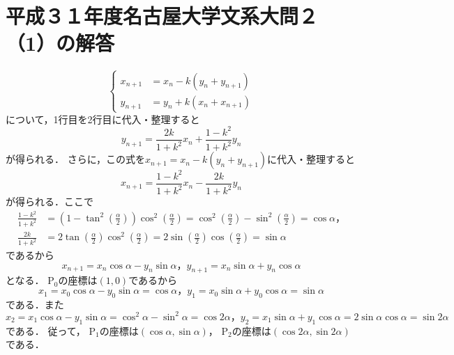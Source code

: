 \documentclass{jsarticle}
\begin{document}
\section{平成３１年度名古屋大学文系大問２（1）の解答}
\[
\begin{cases}
x_{n+1}&=x_n-k(y_n+y_{n+1}) \\
y_{n+1}&=y_n+k(x_n+x_{n+1})
\end{cases}
\]
について，1行目を2行目に代入・整理すると
\[
y_{n+1}=\frac{2k}{1+k^2}x_n+\frac{1-k^2}{1+k^2}y_n
\]
が得られる．
さらに，この式を$x_{n+1}=x_n-k(y_n+y_{n+1})$に代入・整理すると
\[
x_{n+1}=\frac{1-k^2}{1+k^2}x_n-\frac{2k}{1+k^2}y_n
\]
が得られる．ここで
\begin{align*}
\frac{1-k^2}{1+k^2}
&=(1-\tan^2(\frac{\alpha}{2}))\cos^2(\frac{\alpha}{2})
=\cos^2(\frac{\alpha}{2})-\sin^2(\frac{\alpha}{2})
=\cos\alpha，\\
\frac{2k}{1+k^2}
&=2\tan(\frac{\alpha}{2})\cos^2(\frac{\alpha}{2})
=2\sin(\frac{\alpha}{2})\cos(\frac{\alpha}{2})
=\sin\alpha
\end{align*}
であるから
\[
x_{n+1}=x_n\cos\alpha-y_n\sin\alpha，
y_{n+1}=x_n\sin\alpha+y_n\cos\alpha
\]
となる．
$\mathrm{P}_0$の座標は$(1,0)$であるから
\[
x_1=x_0\cos\alpha-y_0\sin\alpha=\cos\alpha，
y_1=x_0\sin\alpha+y_0\cos\alpha=\sin\alpha
\]
である．また
\[
x_2=x_1\cos\alpha-y_1\sin\alpha=\cos^2\alpha-\sin^2\alpha=\cos2\alpha，
y_2=x_1\sin\alpha+y_1\cos\alpha=2\sin\alpha\cos\alpha=\sin2\alpha
\]
である．
従って，
$\mathrm{P}_1$の座標は$(\cos\alpha,\sin\alpha)$，
$\mathrm{P}_2$の座標は$(\cos2\alpha,\sin2\alpha)$
である．
\end{document}
